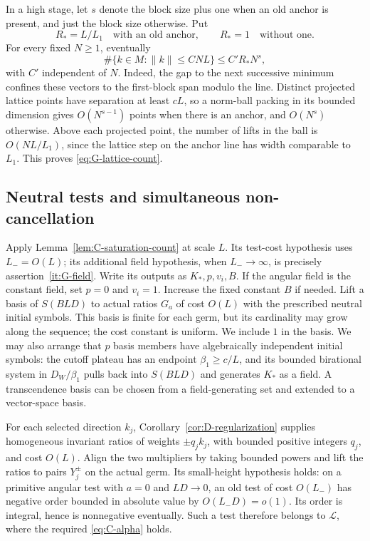 In a high stage, let $s$ denote the block size plus one when an old anchor
is present, and just the block size otherwise.  Put
\begin{equation}\label{eq:G-Rstar}
 R_* = L/L_1\quad\text{with an old anchor},
 \qquad R_*=1\quad\text{without one}.
\end{equation}
For every fixed $N\ge1$, eventually
\begin{equation}\label{eq:G-lattice-count}
 \#\{k\in M:\|k\|\le CNL\}\le C'R_*N^s,
\end{equation}
with $C'$ independent of $N$.  Indeed, the gap to the next successive
minimum confines these vectors to the first-block span modulo the line.
Distinct projected lattice points have separation at least $cL$, so a
norm-ball packing in its bounded dimension gives $O(N^{s-1})$ points
when there is an anchor, and $O(N^s)$ otherwise.  Above each projected
point, the number of lifts in the ball is $O(NL/L_1)$, since the lattice
step on the anchor line has width comparable to $L_1$.  This proves
\eqref{eq:G-lattice-count}.

\subsection{Neutral tests and simultaneous non-cancellation}

Apply Lemma~\ref{lem:C-saturation-count} at scale $L$.
Its test-cost hypothesis uses $L_-=O(L)$; its additional field hypothesis,
when $L_-\to\infty$, is precisely assertion~\ref{it:G-field}.
Write its outputs as $K_*,p,v_i,B$.  If the angular field is the constant
field, set $p=0$ and $v_i=1$.  Increase the fixed constant $B$ if needed.
Lift a basis of $S(BLD)$ to actual ratios $G_a$ of cost $O(L)$ with the
prescribed neutral initial symbols.  This basis is finite for each germ,
but its cardinality may grow along the sequence; the cost constant is
uniform.  We include $1$ in the basis.  We may
also arrange that $p$ basis members have algebraically independent
initial symbols: the cutoff plateau has an endpoint $\beta_1\ge c/L$,
and its bounded birational system in $D_W/\beta_1$ pulls back into
$S(BLD)$ and generates $K_*$ as a field.  A transcendence basis can be
chosen from a field-generating set and extended to a vector-space basis.

For each selected direction $k_j$, Corollary~\ref{cor:D-regularization}
supplies homogeneous invariant ratios of weights $\pm q_jk_j$, with
bounded positive integers $q_j$, and cost $O(L)$.  Align the two
multipliers by taking bounded powers and lift the ratios to pairs
$Y_j^\pm$ on the actual germ.  Its small-height hypothesis holds: on a
primitive angular test with $a=0$ and $LD\to0$, an old test of cost
$O(L_-)$ has negative order bounded in absolute value by $O(L_-D)=o(1)$.
Its order is integral, hence is nonnegative eventually.  Such a test
therefore belongs to $\mathcal L$, where the required
\eqref{eq:C-alpha} holds.

